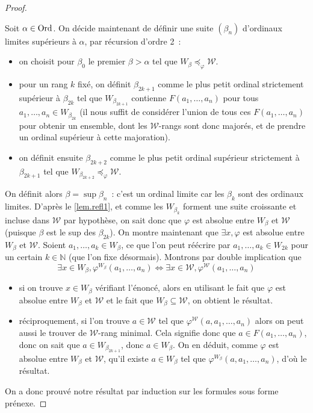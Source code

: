 \begin{proof}
\begin{itemize}
    Soit $\alpha \in \operatorname{Ord}$. On décide maintenant de définir une suite
    $(\beta_n)$ d'ordinaux limites supérieurs à $\alpha$, par récursion d'ordre
    2~:
    \begin{itemize}
    \item on choisit pour $\beta_0$ le premier $\beta > \alpha$ tel que
      $W_\beta \preccurlyeq_\varphi \mathcal W$.
    \item pour un rang $k$ fixé, on définit $\beta_{2k + 1}$ comme le plus
      petit ordinal strictement supérieur à $\beta_{2k}$ tel que
      $W_{\beta_{2k + 1}}$ contienne $F(a_1,\ldots,a_n)$ pour tous
      $a_1,\ldots,a_n \in W_{\beta_{2k}}$ (il nous suffit de considérer l'union de
      tous ces $F(a_1,\ldots,a_n)$ pour obtenir un ensemble, dont les
      $\mathcal W$-rangs sont donc majorés, et de prendre un ordinal supérieur
      à cette majoration).
    \item on définit ensuite $\beta_{2k + 2}$ comme le plus petit ordinal
      supérieur strictement à $\beta_{2k + 1}$ tel que
      $W_{\beta_{2k + 2}}\preccurlyeq_\varphi \mathcal W$.
    \end{itemize}
    On définit alors $\beta = \sup \beta_n$~: c'est un ordinal limite car
    les $\beta_k$ sont des ordinaux limites. D'après le \cref{lem.refl1}, et
    comme les $W_{\beta_k}$ forment une suite croissante et incluse dans
    $\mathcal W$ par hypothèse, on sait donc que $\varphi$ est absolue entre
    $W_\beta$ et $\mathcal W$ (puisque $\beta$ est le sup des $\beta_{2k}$). On
    montre maintenant que $\exists x, \varphi$ est absolue entre $W_\beta$ et
    $\mathcal W$. Soient $a_1,\ldots,a_k \in W_\beta$, ce que l'on peut
    réécrire par $a_1,\ldots,a_k \in W_{2k}$ pour un certain $k \in \mathbb N$
    (que l'on fixe désormais). Montrons par double implication que
    \[\exists x\in W_\beta, \varphi^{W_\beta}(a_1,\ldots,a_n) \iff
    \exists x \in \mathcal W, \varphi^{\mathcal W}(a_1,\ldots,a_n)\]
    \begin{itemize}
    \item si on trouve $x \in W_\beta$ vérifiant l'énoncé, alors en utilisant
      le fait que $\varphi$ est absolue entre $W_\beta$ et $\mathcal W$ et
      le fait que $W_\beta \subseteq \mathcal W$, on obtient le résultat.
    \item réciproquement, si l'on trouve $a \in \mathcal W$ tel que
      $\varphi^\mathcal W(a,a_1,\ldots,a_n)$ alors on peut aussi le trouver de
      $\mathcal W$-rang minimal. Cela signifie donc que
      $a \in F(a_1,\ldots,a_n)$, donc on sait que $a \in W_{\beta_{2k + 1}}$, donc
      $a \in W_\beta$. On en déduit, comme $\varphi$ est absolue entre
      $W_\beta$ et $\mathcal W$, qu'il existe $a\in W_\beta$
      tel que $\varphi^{W_\beta}(a,a_1,\ldots,a_n)$, d'où le résultat.
    \end{itemize}
  \end{itemize}
  On a donc prouvé notre résultat par induction sur les formules sous forme
  prénexe.
\end{proof}

